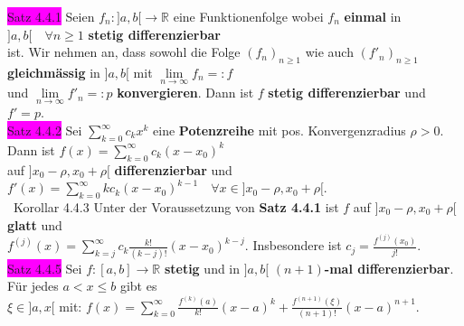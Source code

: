 \documentclass[10pt]{article}
\begin{document}
\colorbox{magenta}{Satz 4.4.1} Seien \textcolor{NavyBlue}{$f_n:]a,b[\longrightarrow\mathbb{R}$} 
                eine Funktionenfolge wobei \textcolor{NavyBlue}{$f_n$} \textbf{einmal} in 
                \textcolor{NavyBlue}{$]a,b[\quad\forall n\geqslant1$} 
                \textbf{stetig differenzierbar}\\
        \indent ist.
                Wir nehmen an, dass sowohl die Folge \textcolor{NavyBlue}{$(f_n)_{n\geqslant1}$} 
                wie auch \textcolor{NavyBlue}{$(f'_n)_{n\geqslant1}$} 
                \textbf{gleichmässig} in \textcolor{NavyBlue}{$]a,b[$} mit 
                \textcolor{NavyBlue}{$\lim\limits_{n\to\infty}f_n=:f$} \\
        \indent und \textcolor{NavyBlue}{$\lim\limits_{n\to\infty}f'_n=:p$}
                \textbf{konvergieren}. Dann ist \textcolor{NavyBlue}{$f$}
                \textbf{stetig differenzierbar} 
                und \textcolor{NavyBlue}{$f'=p$}. \\
\colorbox{magenta}{Satz 4.4.2} Sei \textcolor{NavyBlue}{$\sum_{k=0}^\infty c_kx^k$} 
                eine \textbf{Potenzreihe} mit 
                pos. Konvergenzradius \textcolor{NavyBlue}{$\rho>0$}. Dann ist
                \textcolor{NavyBlue}{$f(x)=\sum_{k=0}^\infty c_k(x-x_0)^k$} \\
        \indent auf \textcolor{NavyBlue}{$]x_0-\rho,x_0+\rho[$} \textbf{differenzierbar} und 
                \textcolor{NavyBlue}{$f'(x)=\sum_{k=0}^\infty kc_k(x-x_0)^{k-1}\quad
                \forall x\in]x_0-\rho,x_0+\rho[$}.\\\
\colorbox{BurntOrange}{Korollar 4.4.3} Unter der Voraussetzung von \textbf{Satz 4.4.1} ist 
                \textcolor{NavyBlue}{$f$} auf \textcolor{NavyBlue}{$]x_0-\rho,x_0+\rho[$} 
                \textbf{glatt} und \\
        \indent \textcolor{NavyBlue}{
                $f^{(j)}(x)=\sum_{k=j}^\infty c_k\frac{k!}{(k-j)!}(x-x_0)^{k-j}$}. 
                Insbesondere ist \textcolor{NavyBlue}{$c_j=\frac{f^{(j)}(x_0)}{j!}$}.\\
\colorbox{magenta}{Satz 4.4.5} Sei \textcolor{NavyBlue}{$f:[a,b]\longrightarrow\mathbb{R}$}
                \textbf{stetig} und in 
                \textcolor{NavyBlue}{$]a,b[$} \textbf{$(n+1)$-mal differenzierbar}. 
                Für jedes \textcolor{NavyBlue}{$a<x\leqslant b$} gibt es \\
        \indent \textcolor{NavyBlue}{$\xi\in]a,x[$} mit: 
                \textcolor{NavyBlue}{$f(x)=\sum_{k=0}^\infty\frac{f^{(k)}(a)}{k!}(x-a)^k
                +\frac{f^{(n+1)}(\xi)}{(n+1)!}(x-a)^{n+1}$}. \\
\end{document}
